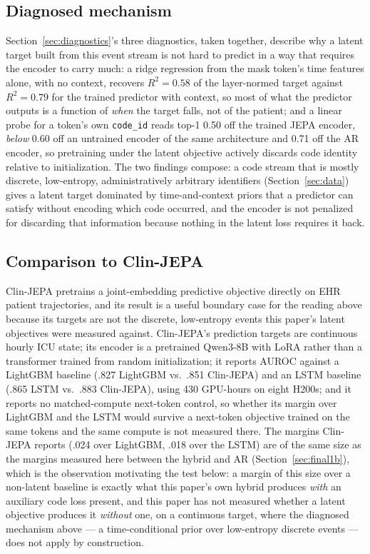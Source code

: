 \documentclass[11pt,a4paper]{article}
\newcommand{\code}[1]{\texttt{\small #1}}
\begin{document}
\subsection{Diagnosed mechanism}

Section~\ref{sec:diagnostics}'s three diagnostics, taken together, describe
why a latent target built from this event stream is not hard to predict in a
way that requires the encoder to carry much: a ridge regression from the
mask token's time features alone, with no context, recovers $R^2 = 0.58$ of
the layer-normed target against $R^2 = 0.79$ for the trained predictor with
context, so most of what the predictor outputs is a function of \emph{when}
the target falls, not of the patient; and a linear probe for a token's own
\code{code\_id} reads top-1 0.50 off the trained JEPA encoder, \emph{below}
0.60 off an untrained encoder of the same architecture and 0.71 off the AR
encoder, so pretraining under the latent objective actively discards code
identity relative to initialization. The two findings compose: a code
stream that is mostly discrete, low-entropy, administratively arbitrary
identifiers (Section~\ref{sec:data}) gives a latent target dominated by
time-and-context priors that a predictor can satisfy without encoding which
code occurred, and the encoder is not penalized for discarding that
information because nothing in the latent loss requires it back.

\subsection{Comparison to Clin-JEPA}

Clin-JEPA \citep{clinjepa} pretrains a joint-embedding predictive objective
directly on EHR patient trajectories, and its result is a useful boundary
case for the reading above because its targets are not the discrete,
low-entropy events this paper's latent objectives were measured against.
Clin-JEPA's prediction targets are continuous hourly ICU state; its encoder
is a pretrained Qwen3-8B with LoRA rather than a transformer trained from
random initialization; it reports AUROC against a LightGBM baseline (.827
LightGBM vs.\ .851 Clin-JEPA) and an LSTM baseline (.865 LSTM vs.\ .883
Clin-JEPA), using 430 GPU-hours on eight H200s; and it reports no
matched-compute next-token control, so whether its margin over LightGBM and
the LSTM would survive a next-token objective trained on the same tokens and
the same compute is not measured there. The margins Clin-JEPA reports
(.024 over LightGBM, .018 over the LSTM) are of the same size as the
margins measured here between the hybrid and AR (Section~\ref{sec:final1b}),
which is the observation motivating the test below: a margin of this size
over a non-latent baseline is exactly what this paper's own hybrid produces
\emph{with} an auxiliary code loss present, and this paper has not measured
whether a latent objective produces it \emph{without} one, on a continuous
target, where the diagnosed mechanism above --- a time-conditional prior
over low-entropy discrete events --- does not apply by construction.
\end{document}
